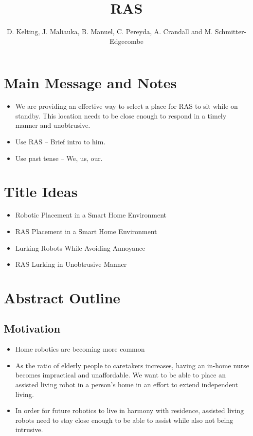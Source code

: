 \documentclass[11pt, conference, a4paper]{IEEEtran}
\author{D. Kelting, J. Maliauka, B. Manuel, C. Pereyda, A. Crandall and M. Schmitter-Edgecombe}
\title{RAS}
\begin{document}
\maketitle


\section{Main Message and Notes}
\begin{itemize}
	\item We are providing an effective way to select a place for RAS to sit while on standby. This location needs to be close enough to respond in a timely manner and unobtrusive.
	\item Use RAS -- Brief intro to him.
	\item Use past tense -- We, us, our.
\end{itemize}


\section{Title Ideas}
\begin{itemize}
	\item Robotic Placement in a Smart Home Environment
	\item RAS Placement in a Smart Home Environment 
	\item Lurking Robots While Avoiding Annoyance
	\item RAS Lurking in Unobtrusive Manner
\end{itemize}


\section{Abstract Outline}


\subsection{Motivation}
\begin{itemize}
    \item Home robotics are becoming more common
    \item As the ratio of elderly people to caretakers increases, having an 
        in-home nurse becomes impractical and unaffordable. We want to be able to place an assisted living robot 
        in a person's home in an effort to extend independent living.
    \item In order for future robotics to live in harmony with residence, assisted living robots need 		to stay close enough to be able to assist while also not being intrusive. 
\end{itemize}
\end{document}
